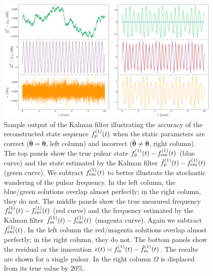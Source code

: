 \documentclass[fleqn,usenatbib,useAMS]{mnras}
\begin{document}
\begin{figure}
	\includegraphics[width=\textwidth, height =0.5\textwidth]{images/Kalman_example_both}
	\caption{Sample output of the Kalman filter illustrating the accuracy of the reconstructed state sequence $f_{\rm p}^{(1)}(t)$ when the static parameters are correct (${\boldsymbol{\hat\theta}} = {\boldsymbol{\theta}}$, left column) and incorrect (${\boldsymbol{\hat\theta}} \neq {\boldsymbol{\theta}}$, right column). The top panels show the true pulsar state $f_{\rm p}^{(1)}(t) - f_{\rm em}^{(1)}(t)$ (blue curve) and the state estimated by the Kalman filter $\hat{f}_{\rm p}^{(1)}(t) - f_{\rm em}^{(1)}(t)$  (green curve). We subtract $f_{\rm em}^{(1)}(t)$ to better illustrate the stochastic wandering of the pulsar frequency. In the left column, the blue/green solutions overlap almost perfectly; in the right column, they do not. The middle panels show the true measured frequency $f_{\rm m}^{(1)}(t) - f_{\rm em}^{(1)}(t)$ (red curve) and the frequency estimated  by the Kalman filter $\hat{f}_{\rm m}^{(1)}(t) - f_{\rm em}^{(1)}(t)$ (magenta curve). Again we subtract $f_{\rm em}^{(1)}(t)$. In the left column the red/magenta solutions overlap almost perfectly; in the right column, they do not. The bottom panels show the residual or the innovation $\epsilon(t) =f_{\rm m}^{(1)}(t) - \hat{f}_{\rm m}^{(1)}(t)$. The results are shown for a single pulsar. In the right column $\Omega$ is displaced from its true value by 20\%.} 
	\label{fig:kalman_example}
\end{figure}
\end{document}
